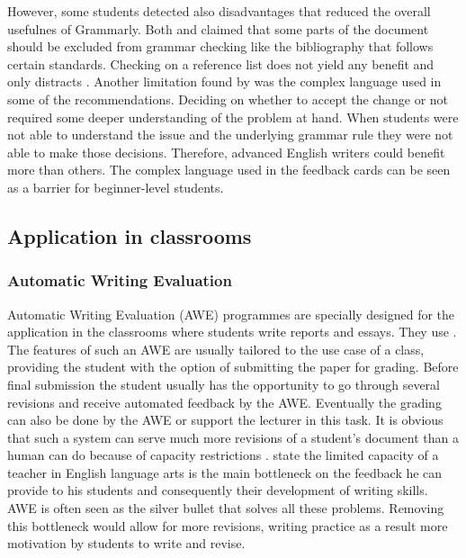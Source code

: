 \documentclass[runningheads]{llncs}
\begin{document}
However, some students detected also disadvantages that reduced the overall usefulnes of Grammarly. Both \citeauthor{ventayen_graduate_2018} and  \citeauthor{nova_utilizing_2018} claimed that some parts of the document should be excluded from grammar checking like the bibliography that follows certain standards. Checking on a reference list does not yield any benefit and only distracts \citep{ventayen_graduate_2018, nova_utilizing_2018}. Another limitation found by \textcite{cavaleri_you_2016} was the complex language used in some of the recommendations. Deciding on whether to accept the change or not required some deeper understanding of the problem at hand. When students were not able to understand the issue and the underlying grammar rule they were not able to make those decisions. Therefore, advanced English writers could benefit more than others. The complex language used in the feedback cards can be seen as a barrier for beginner-level students. 

\subsection{Application in classrooms}
\subsubsection{Automatic Writing Evaluation}
Automatic Writing Evaluation (AWE) programmes are specially designed for the application in the classrooms where students write reports and essays. They use  .
The features of such an AWE are usually tailored to the use case of a class, providing the student with the option of submitting the paper for grading. Before final submission the student usually has the opportunity to go through several revisions and receive automated feedback by the AWE. Eventually the grading can also be done by the AWE or support the lecturer in this task. It is obvious that such a system can serve much more revisions of a student's document than a human can do because of capacity restrictions \citep{warschauer_automated_2006}. \textcite{grimes_utility_2010} state the limited capacity of a teacher in English language arts is the main bottleneck on the feedback he can provide to his students and consequently their development of writing skills. AWE is often seen as the silver bullet that solves all these problems. Removing this bottleneck would allow for more revisions, writing practice as a result more motivation by students to write and revise.        
\end{document}
